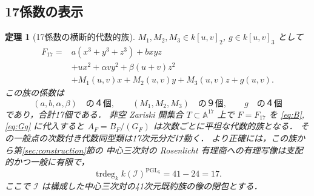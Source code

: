 \documentclass[11pt,a4paper]{ltjsarticle}
\numberwithin{equation}{section}
\newtheorem{theorem}{定理}[section]
\newcommand{\A}{\mathbb A}
\newcommand{\cI}{\mathcal I}
\newcommand{\trdeg}{\operatorname{trdeg}}
\newcommand{\PGL}{\mathrm{PGL}}
\begin{document}
\subsection{17係数の表示}
\begin{theorem}[17係数の横断的代数的族]\label{thm:17}
$M_1,M_2,M_3\in k[u,v]_2$, $g\in k[u,v]_3$ として
\begin{equation}\label{eq:F17}
\boxed{\begin{aligned}
 F_{17}={}&a(x^3+y^3+z^3)+bxyz\\
 &+ux^2+\alpha vy^2+\beta(u+v)z^2\\
 &+M_1(u,v)x+M_2(u,v)y+M_3(u,v)z+g(u,v).
\end{aligned}}
\end{equation}
この族の係数は
\begin{equation}\label{eq:count17}
 (a,b,\alpha,\beta)\quad\text{の４個},\qquad
 (M_1,M_2,M_3)\quad\text{の９個},\qquad
 g\quad\text{の４個}
\end{equation}
であり，合計17個である．
非空 Zariski 開集合 $T\subset\A^{17}$ 上で
$F=F_{17}$ を \eqref{eq:B}, \eqref{eq:Gg} に代入すると
$A_F=B_F/(G_F)$ は次数ごとに平坦な代数的族となる．
その一般点の次数付き代数同型類は17次元分だけ動く．
より正確には，この族から第\ref{sec:construction}節の
中心三次対の Rosenlicht 有理商への有理写像は支配的かつ一般に有限で，
\begin{equation}\label{eq:17mod}
 \trdeg_k k(\cI)^{\PGL_5}=41-24=17.
\end{equation}
ここで $\cI$ は構成した中心三次対の41次元既約族の像の閉包とする．
\end{theorem}
\end{document}

